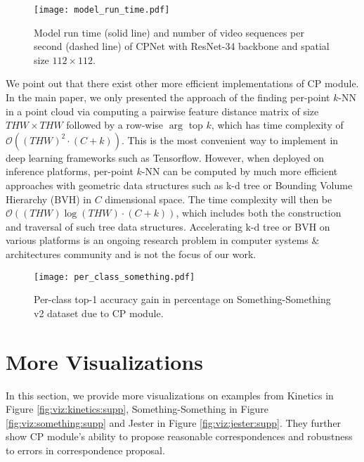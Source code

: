 \documentclass[10pt,twocolumn,letterpaper]{article}
\begin{document}
\begin{figure}[t]
\centering
\texttt{[image: model\_run\_time.pdf]}
\caption{Model run time (solid line) and number of video sequences per second (dashed line) of CPNet with ResNet-34 backbone and spatial size $112\times112$.}
\label{fig:run:time}
\vspace{-2ex}
\end{figure}

We point out that there exist other more efficient implementations of CP module.  In the main paper, we only presented the approach of the finding per-point $k$-NN in a point cloud via computing a pairwise feature distance matrix of size $THW\times THW$ followed by a row-wise $\arg$ top $k$, which has time complexity of $\mathcal{O} ((THW)^2\cdot (C+k))$. This is the most convenient way to implement in deep learning frameworks such as Tensorflow. 
However, when deployed on inference platforms, per-point $k$-NN  can be computed by much more efficient approaches with geometric data structures such as k-d tree \cite{kd-tree} or Bounding Volume Hierarchy (BVH) \cite{BVH} in $C$ dimensional space. The time complexity will then be $\mathcal{O} ((THW)\log(THW)\cdot (C+k))$, which includes both the construction and traversal of such tree data structures. Accelerating k-d tree or BVH on various platforms is an ongoing research problem in computer systems \& architectures community and is not the focus of our work. 

\begin{figure*}[h]
\centering
\vspace{-5.5ex}
\texttt{[image: per\_class\_something.pdf]}
\vspace{-2ex}
\caption{Per-class top-1 accuracy gain in percentage on Something-Something v2 dataset due to CP module.}\label{fig:per_class:something}
\end{figure*}

\section{More Visualizations}
\label{sec:viz}

In this section, we provide more visualizations on examples from Kinetics \cite{Kinetics} in Figure \ref{fig:viz:kinetics:supp}, Something-Something \cite{Something:Something} in Figure \ref{fig:viz:something:supp} and Jester \cite{Jester} in Figure \ref{fig:viz:jester:supp}. They further show CP module's ability to propose reasonable correspondences and robustness to errors in correspondence proposal.
\end{document}

